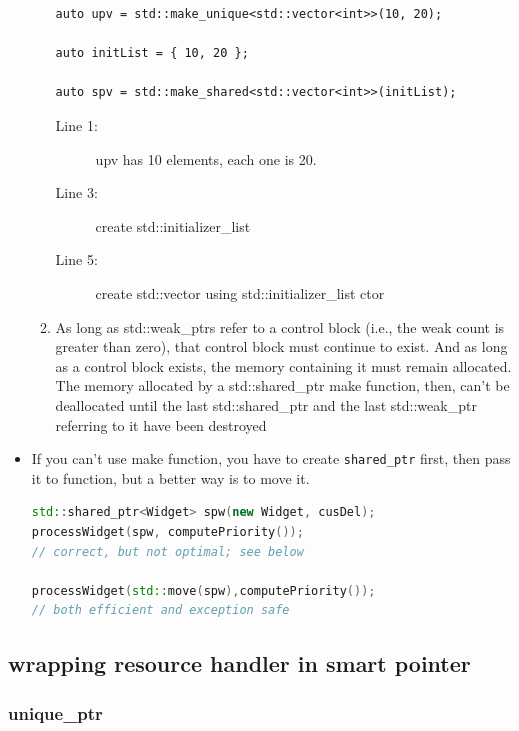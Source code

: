 \documentclass[a4paper,11pt,twoside]{book}
\begin{document}
\begin{itemize}
\begin{enumerate}
\begin{lstlisting}
auto upv = std::make_unique<std::vector<int>>(10, 20);

auto initList = { 10, 20 };

auto spv = std::make_shared<std::vector<int>>(initList);
\end{lstlisting}
\begin{description}
	\item[Line 1:] upv has 10 elements, each one is 20.
	\item[Line 3:] create std::initializer\_list
	\item[Line 5:] create std::vector using std::initializer\_list ctor
\end{description}
		
		\item As long as std::weak\_ptrs refer to a control block (i.e., the weak count is greater than zero), that control block must continue to exist. And as long as a control block exists, the memory containing it must remain allocated. The memory allocated by a std::shared\_ptr make function, then, can't be deallocated until the last std::shared\_ptr and the last std::weak\_ptr referring to it have been destroyed
	\end{enumerate}
	
	\item If you can't use make function, you have to create \texttt{shared\_ptr} first, then pass it to function, but a better way is to move it.
\begin{lstlisting}[frame=single, language=c++]
std::shared_ptr<Widget> spw(new Widget, cusDel);
processWidget(spw, computePriority()); 
// correct, but not optimal; see below

processWidget(std::move(spw),computePriority());  
// both efficient and exception safe
\end{lstlisting}
	
\end{itemize}

\subsection{wrapping resource handler in smart pointer}

\subsubsection{unique\_ptr}
\end{document}
